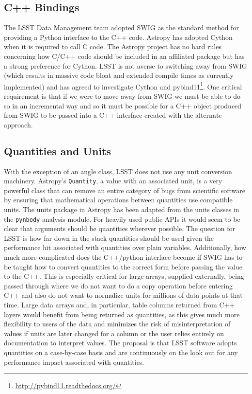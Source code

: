 \documentclass[]{spie}  %
\begin{document}
\subsection{C++ Bindings}

The LSST Data Management team adopted SWIG as the standard method for providing a Python interface to the C++ code.
Astropy has adopted Cython\cite{2010/content/aip/journal/cise/13/2/10.1109/MCSE.2010.118} when it is required to call C code.
The Astropy project has no hard rules concerning how C/C++ code should be included in an affiliated package but has a strong preference for Cython.
LSST is not averse to switching away from SWIG (which results in massive code bloat and extended compile times as currently implemented) and has agreed to investigate Cython\cite{dmtn-013} and pybind11\cite{dmtn-014}\footnote{\url{http://pybind11.readthedocs.org/}}.
One critical requirement is that if we were to move away from SWIG we must be able to do so in an incremental way and so it must be possible for a C++ object produced from SWIG to be passed into a C++ interface created with the alternate approach.

\subsection{Quantities and Units}

With the exception of an angle class, LSST does not use any unit conversion machinery.
Astropy's \texttt{Quantity}, a value with an associated unit, is a very powerful class that can remove an entire category of bugs from scientific software by ensuring that mathematical operations between quantities use compatible units.
The units package in Astropy has been adapted from the units classes in the \texttt{pynbody} analysis module\cite{pynbody}.
For heavily used public APIs it would seem to be clear that arguments should be quantities wherever possible.
The question for LSST is how far down in the stack quantities should be used given the performance hit associated with quantities over plain variables.
Additionally, how much more complicated does the C++/python interface become if SWIG has to be taught how to convert quantities to the correct form before passing the value to the C++.
This is especially critical for large arrays, supplied externally, being passed through where we do not want to do a copy operation before entering C++ and also do not want to normalize units for millions of data points at that time.
Large data arrays and, in particular, table columns returned from C++ layers would benefit from being returned as quantities, as this gives much more flexibility to users of the data and minimizes the risk of misinterpretation of values if units are later changed for a column or the user relies entirely on documentation to interpret values.
The proposal is that LSST software adopts quantities on a case-by-case basis and are continuously on the look out for  any performance impact associated with quantities.
\end{document}
